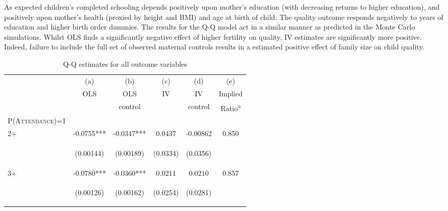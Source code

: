 \documentclass{article}[11pt,subeqn]
\begin{document}
\begin{spacing}{1.25}
As expected children's completed schooling depends positively upon mother's education (with decreasing returns to higher education), 
and positively upon mother's health (proxied by height and BMI) and age at birth of child.  The quality outcome responds negatively to 
years of education and higher birth order dummies.  The results for the Q-Q model act in a similar manner as predicted in the Monte
Carlo simulations.  Whilst OLS finds a significantly negative effect of higher fertility on quality, IV estimates are significantly
more positive.  Indeed, failure to include the full set of observed maternal controls results in a estimated positive effect of family
size on child quality. 

\begin{table}[!htbp]
\caption{Q-Q estimates for all outcome variables}
\vspace{-3mm}
\label{tab:fertilityALL}
\begin{center}
\begin{tabular}{lccccc} \toprule 
& (a) & (b)  & (c) & (d) & (e) \\ 
& OLS & OLS  & IV & IV & Implied \\ 
&  &  control &  & control & Ratio\textsuperscript{a} \\ 
\midrule
\textsc{P(Attendance)=1} & & & & &\\
2+ & -0.0755*** & -0.0347*** & 0.0437  & -0.00862 & 0.850 \\
\vspace{4pt} & \begin{footnotesize}(0.00144)\end{footnotesize} & \begin{footnotesize}(0.00189)\end{footnotesize} & \begin{footnotesize}(0.0334)\end{footnotesize} & \begin{footnotesize}(0.0356)\end{footnotesize} & \begin{footnotesize}\end{footnotesize} \\
3+ & -0.0780*** &	-0.0360*** & 0.0211 & 0.0210 &  0.857 \\
\vspace{4pt} & \begin{footnotesize}(0.00126)\end{footnotesize} & \begin{footnotesize}(0.00162)\end{footnotesize} & \begin{footnotesize}(0.0254)\end{footnotesize} & \begin{footnotesize}(0.0281)\end{footnotesize} & \begin{footnotesize}\end{footnotesize} \\

\end{tabular}
\end{center}
\end{table}
\end{spacing}
\end{document}
